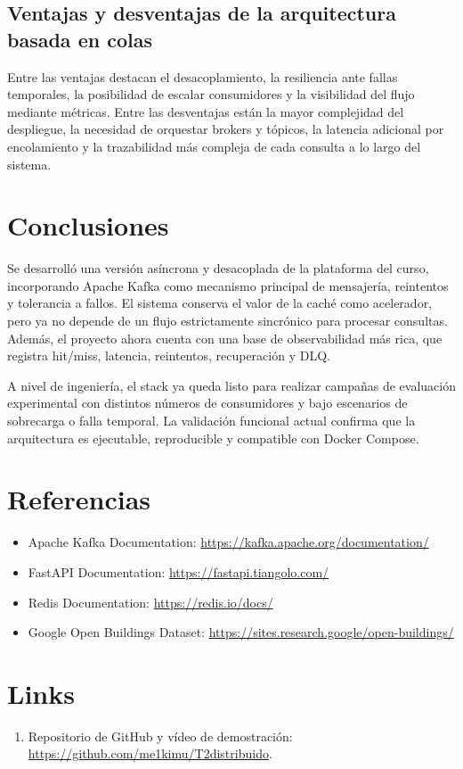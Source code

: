 \documentclass[letter,12pt]{article}
\begin{document}
\subsection{Ventajas y desventajas de la arquitectura basada en colas}
Entre las ventajas destacan el desacoplamiento, la resiliencia ante fallas temporales, la posibilidad de escalar consumidores y la visibilidad del flujo mediante m\'etricas. Entre las desventajas est\'an la mayor complejidad del despliegue, la necesidad de orquestar brokers y t\'opicos, la latencia adicional por encolamiento y la trazabilidad m\'as compleja de cada consulta a lo largo del sistema.

\section{Conclusiones}
Se desarroll\'o una versi\'on as\'incrona y desacoplada de la plataforma del curso, incorporando Apache Kafka como mecanismo principal de mensajer\'ia, reintentos y tolerancia a fallos. El sistema conserva el valor de la cach\'e como acelerador, pero ya no depende de un flujo estrictamente sincr\'onico para procesar consultas. Adem\'as, el proyecto ahora cuenta con una base de observabilidad m\'as rica, que registra hit/miss, latencia, reintentos, recuperaci\'on y DLQ.

A nivel de ingenier\'ia, el stack ya queda listo para realizar campa\~nas de evaluaci\'on experimental con distintos n\'umeros de consumidores y bajo escenarios de sobrecarga o falla temporal. La validaci\'on funcional actual confirma que la arquitectura es ejecutable, reproducible y compatible con Docker Compose.

\section{Referencias}
\begin{itemize}
    \item Apache Kafka Documentation: \url{https://kafka.apache.org/documentation/}
    \item FastAPI Documentation: \url{https://fastapi.tiangolo.com/}
    \item Redis Documentation: \url{https://redis.io/docs/}
    \item Google Open Buildings Dataset: \url{https://sites.research.google/open-buildings/}
\end{itemize}

\section*{Links}
\begin{enumerate}
    \item Repositorio de GitHub y vídeo de demostración: \url{https://github.com/me1kimu/T2distribuido}.
\end{enumerate}
\end{document}
